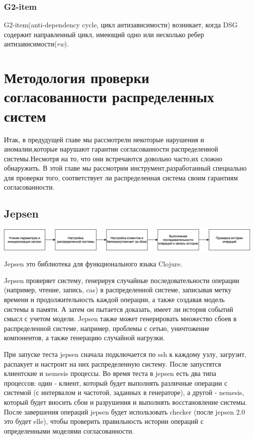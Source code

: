 \documentclass[12pt,  openany]{book}
\begin{document}
\subsection{G2-item}
G2-item(anti-dependency cycle, цикл антизависимости) возникает, когда DSG содержит направленный цикл, имеющий одно или несколько ребер антизависимости(\textit{rw}). 

\chapter{Методология проверки согласованности распределенных систем}
Итак, в предудущей главе мы рассмотрели некоторые нарушения и аномалии,которые нарушают гарантии согласованности распределенной системы.Несмотря на то, что они встречаются довольно часто,их сложно обнаружить.  В этой главе мы рассмотрим инструмент,разработанный специально для проверки того, соответствует ли распределенная система своим гарантиям согласованности.
\section{Jepsen}
\includegraphics[scale=0.175]{jepsen.jpeg}
\par
Jepsen это библиотека для функционального языка Clojure.
\par
Jepsen проверяет систему, генерируя случайные последовательности операции (например, чтение, запись, cas) в распределенной системе, записывая метку времени и продолжительность каждой операции, а также создавая модель системы в памяти. А затем он пытается доказать, имеет ли история событий смысл с учетом модели.
Jepsen также может генерировать множество сбоев в распределенной системе, например, проблемы с сетью, уничтожение компонентов, а также генерацию случайной нагрузки.
\par
При запуске теста jepsen сначала подключается по ssh к каждому узлу, загрузит, распакует и настроит на них распределенную систему.
После запустятся клиентские и nemesis процессы. Во время теста в jepsen есть два типа процессов: один - клиент, который будет выполнять различные операции с системой (с интервалом и частотой, заданных в генераторе), а другой - nemesis, который будет вносить сбои и разрушения и выполнять восстановление системы. После завершения операций jepsen будет использовать checker (после jepsen 2.0 это будет elle), чтобы проверить правильность истории операций с определенными моделями согласованности.
\end{document}
